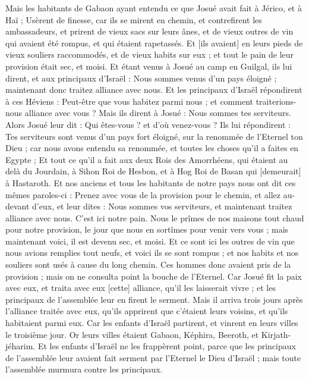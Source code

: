 \begin{multicols}{2}
Mais les habitants de Gabaon ayant entendu ce que Josué avait fait à Jérico, et à Haï ;
Usèrent de finesse, car ils se mirent en chemin, et contrefirent les ambassadeurs, et prirent de vieux sacs sur leurs ânes, et de vieux outres de vin qui avaient été rompus, et qui étaient rapetassés.
Et [ils avaient] en leurs pieds de vieux souliers raccommodés, et de vieux habits sur eux ; et tout le pain de leur provision était sec, et moisi.
Et étant venus à Josué au camp en Guilgal, ils lui dirent, et aux principaux d'Israël : Nous sommes venus d'un pays éloigné ; maintenant donc traitez alliance avec nous.
Et les principaux d'Israël répondirent à ces Héviens : Peut-être que vous habitez parmi nous ; et comment traiterions-nous alliance avec vous ?
Mais ils dirent à Josué : Nous sommes tes serviteurs. Alors Josué leur dit : Qui êtes-vous ? et d'où venez-vous ?
Ils lui répondirent : Tes serviteurs sont venus d'un pays fort éloigné, sur la renommée de l'Eternel ton Dieu ; car nous avons entendu sa renommée, et toutes les choses qu'il a faites en Egypte ;
Et tout ce qu'il a fait aux deux Rois des Amorrhéens, qui étaient au delà du Jourdain, à Sihon Roi de Hesbon, et à Hog Roi de Basan qui [demeurait] à Hastaroth.
Et nos anciens et tous les habitants de notre pays nous ont dit ces mêmes paroles-ci : Prenez avec vous de la provision pour le chemin, et allez au-devant d'eux, et leur dites : Nous sommes vos serviteurs, et maintenant traitez alliance avec nous.
C'est ici notre pain. Nous le prîmes de nos maisons tout chaud pour notre provision, le jour que nous en sortîmes pour venir vers vous ; mais maintenant voici, il est devenu sec, et moisi.
Et ce sont ici les outres de vin que nous avions remplies tout neufs, et voici ils se sont rompus ; et nos habits et nos souliers sont usés à cause du long chemin.
Ces hommes donc avaient pris de la provision ; mais on ne consulta point la bouche de l'Eternel.
Car Josué fit la paix avec eux, et traita avec eux [cette] alliance, qu'il les laisserait vivre ; et les principaux de l'assemblée leur en firent le serment.
Mais il arriva trois jours après l'alliance traitée avec eux, qu'ils apprirent que c'étaient leurs voisins, et qu'ils habitaient parmi eux.
Car les enfants d'Israël partirent, et vinrent en leurs villes le troisième jour. Or leurs villes étaient Gabaon, Képhira, Beeroth, et Kirjath-jéharim.
Et les enfants d'Israël ne les frappèrent point, parce que les principaux de l'assemblée leur avaient fait serment par l'Eternel le Dieu d'Israël ; mais toute l'assemblée murmura contre les principaux.

\end{multicols}
